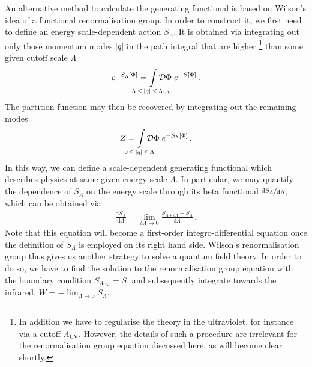 \documentclass[11pt]{book}
\newcommand{\LambdaUV}{ \Lambda_{\scriptscriptstyle{\mathrm{UV}}} }
\newcommand{\SLambda}{ S_{\scriptscriptstyle{\Lambda}} }
\numberwithin{equation}{chapter}
\begin{document}
An alternative method to calculate the generating functional is based
on Wilson's idea of a functional renormalisation group.
In order to construct it, we first need to define an energy scale-dependent
action $\SLambda$. It is obtained via integrating out only those
momentum modes $|q|$ in the path integral that are higher%
\footnote{%
  In addition we have to regularise the theory in the ultraviolet,
  for instance via a cutoff $\LambdaUV$. However, the details
  of such a procedure are irrelevant for the renormalisation group
  equation discussed here, as will become clear shortly.
}
than some given cutoff scale $\Lambda$
\begin{align}
  e^{ - \SLambda \lbrack \Phi \rbrack }
  = \smashoperator{ \int_{ \Lambda \, \leq \, |q| \, \leq \, \LambdaUV } }
  \mathcal D \Phi \;
  e^{-S \lbrack \Phi \rbrack} \,.
\end{align}
The partition function may then be recovered by integrating out
the remaining modes
\begin{align}
  Z
  = \smashoperator{ \int_{ 0 \, \leq \, |q| \, \leq \, \Lambda } }
  \mathcal D \Phi \;
  e^{-\SLambda \lbrack \Phi \rbrack} \,.
\end{align}
In this way, we can define a scale-dependent generating functional which
describes physics at same given energy scale $\Lambda$.
In particular, we may quantify the dependence
of $\SLambda$ on the energy scale through its
beta functional $\nicefrac{ \mathrm d\SLambda }{ \mathrm d\Lambda }$,
which can be obtained via
\begin{align}
  \frac{ \mathrm d \SLambda }{ \mathrm d \Lambda }
  = \lim_{ \delta \Lambda \rightarrow 0 }
  \frac{ S_{\scriptscriptstyle{\Lambda+\delta\Lambda}} - \SLambda }{ \delta \Lambda } \,.
  \label{eq:wilsonRG}
\end{align}
Note that this equation will become a first-order integro-differential equation
once the definition of $\SLambda$ is employed on its right hand side.
Wilson's renormalisation group thus gives us another strategy to
solve a quantum field theory. In order to do so, we have to find the solution to
the renormalisation group equation with the boundary condition
$S_\LambdaUV = S$,
and subsequently integrate towards the infrared,
$W = - \lim_{\Lambda \rightarrow 0} \SLambda$.
\end{document}

